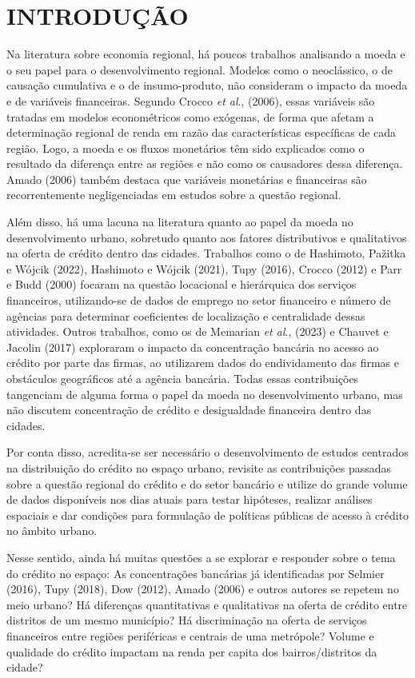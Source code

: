 \documentclass[a4paper,12pt]{article}
\begin{document}
\hypertarget{introduuxe7uxe3o}{%
\section{INTRODUÇÃO}\label{introduuxe7uxe3o}}

Na literatura sobre economia regional, há poucos trabalhos analisando a
moeda e o seu papel para o desenvolvimento regional. Modelos como o
neoclássico, o de causação cumulativa e o de insumo-produto, não
consideram o impacto da moeda e de variáveis financeiras. Segundo Crocco
\emph{et al}., (2006), essas variáveis são tratadas em modelos
econométricos como exógenas, de forma que afetam a determinação regional
de renda em razão das características específicas de cada região. Logo,
a moeda e os fluxos monetários têm sido explicados como o resultado da
diferença entre as regiões e não como os causadores dessa diferença.
Amado (2006) também destaca que variáveis monetárias e financeiras são
recorrentemente negligenciadas em estudos sobre a questão regional.

Além disso, há uma lacuna na literatura quanto ao papel da moeda no
desenvolvimento urbano, sobretudo quanto aos fatores distributivos e
qualitativos na oferta de crédito dentro das cidades. Trabalhos como o
de Hashimoto, Pažitka e Wójcik (2022), Hashimoto e Wójcik (2021), Tupy
(2016), Crocco (2012) e Parr e Budd (2000) focaram na questão locacional
e hierárquica dos serviços financeiros, utilizando-se de dados de
emprego no setor financeiro e número de agências para determinar
coeficientes de localização e centralidade dessas atividades. Outros
trabalhos, como os de Memarian \emph{et al}., (2023) e Chauvet e Jacolin
(2017) exploraram o impacto da concentração bancária no acesso ao
crédito por parte das firmas, ao utilizarem dados do endividamento das
firmas e obstáculos geográficos até a agência bancária. Todas essas
contribuições tangenciam de alguma forma o papel da moeda no
desenvolvimento urbano, mas não discutem concentração de crédito e
desigualdade financeira dentro das cidades.

Por conta disso, acredita-se ser necessário o desenvolvimento de estudos
centrados na distribuição do crédito no espaço urbano, revisite as
contribuições passadas sobre a questão regional do crédito e do setor
bancário e utilize do grande volume de dados disponíveis nos dias atuais
para testar hipóteses, realizar análises espaciais e dar condições para
formulação de políticas públicas de acesso à crédito no âmbito urbano.

Nesse sentido, ainda há muitas questões a se explorar e responder sobre
o tema do crédito no espaço: As concentrações bancárias já identificadas
por Selmier (2016), Tupy (2018), Dow (2012), Amado (2006) e outros
autores se repetem no meio urbano? Há diferenças quantitativas e
qualitativas na oferta de crédito entre distritos de um mesmo município?
Há discriminação na oferta de serviços financeiros entre regiões
periféricas e centrais de uma metrópole? Volume e qualidade do crédito
impactam na renda per capita dos bairros/distritos da cidade?
\end{document}

